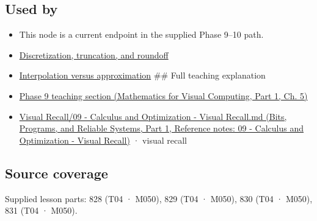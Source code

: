 \subsection{Used by}\label{appendix-32f39e9a3738-used-by}

\hypertarget{appendix-32f39e9a3738-used-by}{}

\begin{itemize}
\item
  This node is a current endpoint in the supplied Phase 9--10 path.
\item
  \hyperref[appendix-6b0648b2b8e8]{Discretization, truncation, and roundoff}
\item
  \hyperref[appendix-0c2a5f69851e]{Interpolation versus approximation} \#\# Full teaching explanation
\item
  \href{../02-Mathematics-for-Visual-Computing-P01/main.pdf\#02-foundations-ii-ch021-jacobians-curvature-and-local-approximation}{Phase 9 teaching section (Mathematics for Visual Computing, Part 1, Ch. 5)}
\item
  \href{../01-Bits-Programs-and-Reliable-Systems-P01/main.pdf\#appendix-adf48f5dc5c1}{Visual Recall/09 - Calculus and Optimization - Visual Recall.md (Bits, Programs, and Reliable Systems, Part 1, Reference notes: 09 - Calculus and Optimization - Visual Recall)} · visual recall
\end{itemize}

\subsection{Source coverage}\label{appendix-32f39e9a3738-source-coverage}

\hypertarget{appendix-32f39e9a3738-source-coverage}{}

Supplied lesson parts: 828 (T04 · M050), 829 (T04 · M050), 830 (T04 · M050), 831 (T04 · M050).
